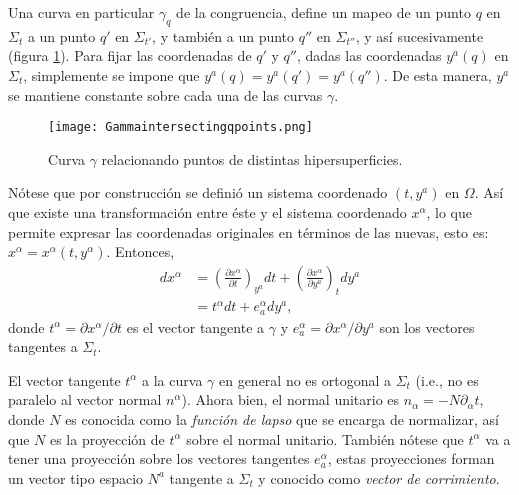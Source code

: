 Una curva en particular $\gamma_{q}$ de la congruencia, define un mapeo de un punto $q$ en $\Sigma_{t}$ a un punto $q'$ en $\Sigma_{t'}$, y tambi\'{e}n a un punto $q''$ en $\Sigma_{t''}$, y as\'{i} sucesivamente (figura \ref{fig:curvagamma}). Para fijar las coordenadas de $q'$ y $q''$, dadas las coordenadas $y^{a}(q)$ en $\Sigma_{t}$, simplemente se impone que $y^{a}(q) = y^{a}(q') = y^{a}(q'')$. De esta manera, $y^{a}$ se mantiene constante sobre cada una de las curvas $\gamma$.

\begin{figure}[H]
\label{fig:curvagamma}
\centering
\texttt{[image: Gammaintersectingqpoints.png]}
\caption{Curva $\gamma$ relacionando puntos de distintas hipersuperficies.}
\end{figure}

N\'{o}tese que por construcci\'{o}n se defini\'{o} un sistema coordenado $(t, y^{a})$ en $\Omega$. As\'{i} que existe una transformaci\'{o}n entre \'{e}ste y el sistema coordenado $x^{\alpha}$, lo que permite expresar las coordenadas originales en t\'{e}rminos de las nuevas, esto es: $x^{\alpha} = x^{\alpha} (t, y^{\alpha})$. Entonces,
%
\begin{align}
\label{eq:dxalpha}
dx^{\alpha} & = \left( \frac{\partial x^{\alpha}}{\partial t} \right)_{y^{a}} dt + \left( \frac{\partial x^{\alpha}}{\partial y^{a}} \right)_{t} dy^{a} \nonumber \\
& = t^{\alpha} dt + e^{\alpha}_{a} dy^{a},
\end{align}
%
donde $t^{\alpha}=\partial x^{\alpha}/\partial t$ es el vector tangente a $\gamma$ y $e^{\alpha}_{a}=\partial x^{\alpha}/\partial y^{a}$ son los vectores tangentes a $\Sigma_{t}$.

El vector tangente $t^{\alpha}$ a la curva $\gamma$ en general no es ortogonal a $\Sigma_{t}$ (i.e., no es paralelo al vector normal $n^{\alpha}$). Ahora bien, el normal unitario es $n_{\alpha} = -N \partial_{\alpha} t$, donde $N$ es conocida como la \emph{funci\'{o}n de lapso} que se encarga de normalizar, as\'{i} que $N$ es la proyecci\'{o}n de $t^{\alpha}$ sobre el normal unitario\footnotemark. Tambi\'{e}n n\'{o}tese que $t^{\alpha}$ va a tener una proyecci\'{o}n sobre los vectores tangentes $e^{\alpha}_{a}$, estas proyecciones forman un vector tipo espacio $N^{a}$ tangente a $\Sigma_{t}$ y conocido como \emph{vector de corrimiento}.

